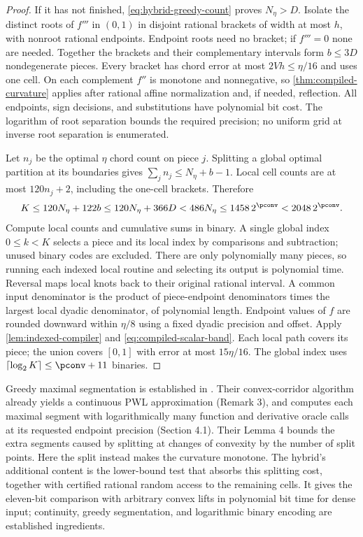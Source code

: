 \begin{proof}
If it has not finished, \eqref{eq:hybrid-greedy-count} proves
$N_\eta>D$. Isolate the distinct roots of $f'''$ in $(0,1)$ in
disjoint rational brackets of width at most $h$, with nonroot rational
endpoints. Endpoint roots need no bracket; if $f'''=0$ none are needed.
Together the brackets and their complementary intervals form
$b\le3D$ nondegenerate pieces. Every bracket has chord error at most
$2Vh\le\eta/16$ and uses one cell. On each complement $f''$ is
monotone and nonnegative, so \cref{thm:compiled-curvature} applies
after rational affine normalization and, if needed, reflection.
All endpoints, sign decisions, and substitutions have polynomial bit
cost. The logarithm of root separation bounds the required precision;
no uniform grid at inverse root separation is enumerated.

Let $n_j$ be the optimal $\eta$ chord count on piece $j$. Splitting
a global optimal partition at its boundaries gives
$\sum_jn_j\le N_\eta+b-1$. Local cell counts are at most
$120n_j+2$, including the one-cell brackets. Therefore
\begin{equation}\label{eq:hybrid-total-cells}
 K\le120N_\eta+122b\le120N_\eta+366D
 <486N_\eta\le1458\,2^{\pconv}<2048\,2^{\pconv}.
\end{equation}
Compute local counts and cumulative sums in binary. A single global
index $0\le k<K$ selects a piece and its local index by comparisons
and subtraction; unused binary codes are excluded. There are only
polynomially many pieces, so running each indexed local routine and
selecting its output is polynomial time. Reversal maps local knots
back to their original rational interval. A common input denominator
is the product of piece-endpoint denominators times the largest local
dyadic denominator, of polynomial length. Endpoint values of $f$ are
rounded downward within $\eta/8$ using a fixed dyadic precision and
offset. Apply \cref{lem:indexed-compiler} and
\eqref{eq:compiled-scalar-band}. Each local path covers its piece;
the union covers $[0,1]$ with error at most $15\eta/16$.
The global index uses $\lceil\log_2K\rceil\le\pconv+11$ binaries.
\end{proof}

Greedy maximal segmentation is established in
\citet[Proposition 1 and Corollary 1]{codsi2025}. Their convex-corridor
algorithm already yields a continuous PWL approximation
(Remark 3), and computes each maximal segment with logarithmically
many function and derivative oracle calls at its requested endpoint
precision (Section 4.1). Their Lemma 4 bounds the extra segments caused
by splitting at changes of convexity by the number of split points.
Here the split instead makes the curvature monotone. The hybrid's
additional content is the lower-bound test that absorbs this splitting
cost, together with certified rational random access to the remaining
cells. It gives the eleven-bit comparison with arbitrary convex lifts
in polynomial bit time for dense input; continuity, greedy segmentation,
and logarithmic binary encoding are established ingredients.

